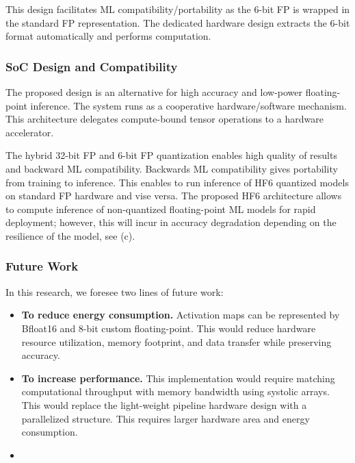 This design facilitates ML compatibility/portability as the 6-bit FP is wrapped in the standard FP representation. The dedicated hardware design extracts the 6-bit format automatically and performs computation.

\subsubsection{SoC Design and Compatibility}
The proposed design is an alternative for high accuracy and low-power floating-point inference. The system runs as a cooperative hardware/software mechanism. This architecture delegates compute-bound tensor operations to a hardware accelerator.

The hybrid 32-bit FP and 6-bit FP quantization enables high quality of results and backward ML compatibility. Backwards ML compatibility gives portability from training to inference. This enables to run inference of HF6 quantized models on standard FP hardware and vise versa. The proposed HF6 architecture allows to compute inference of non-quantized floating-point ML models for rapid deployment; however, this will incur in accuracy degradation depending on the resilience of the model, see (c).

\subsubsection{Future Work}
In this research, we foresee two lines of future work:
\begin{itemize}
\item \textbf{To reduce energy consumption.} Activation maps can be represented by Bfloat16 and 8-bit custom floating-point. This would reduce hardware resource utilization, memory footprint, and data transfer while preserving accuracy.

\item \textbf{To increase performance.} This implementation would require matching computational throughput with memory bandwidth using systolic arrays. This would replace the light-weight pipeline hardware design with a parallelized structure. This requires larger hardware area and energy consumption.

\item {}
\end{itemize}

